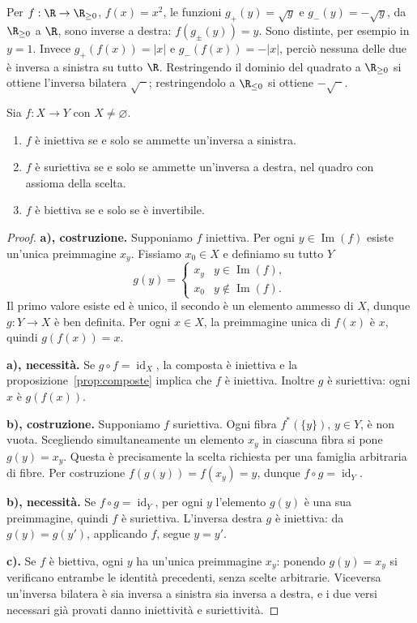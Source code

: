 \begin{esempio}
Per $f:\R\to\R_{\ge0}$, $f(x)=x^2$, le funzioni $g_+(y)=\sqrt y$ e $g_-(y)=-\sqrt y$, da $\R_{\ge0}$ a $\R$, sono inverse a destra: $f(g_\pm(y))=y$. Sono distinte, per esempio in $y=1$. Invece $g_+(f(x))=|x|$ e $g_-(f(x))=-|x|$, perciò nessuna delle due è inversa a sinistra su tutto $\R$. Restringendo il dominio del quadrato a $\R_{\ge0}$ si ottiene l'inversa bilatera $\sqrt{\phantom{x}}$; restringendolo a $\R_{\le0}$ si ottiene $-\sqrt{\phantom{x}}$.
\end{esempio}

\begin{teorema}\label{teo:inverse}
Sia $f:X\to Y$ con $X\ne\varnothing$.
\begin{enumerate}[label=\alph*)]
\item $f$ è iniettiva se e solo se ammette un'inversa a sinistra.
\item $f$ è suriettiva se e solo se ammette un'inversa a destra, nel quadro con assioma della scelta.
\item $f$ è biettiva se e solo se è invertibile.
\end{enumerate}
\end{teorema}
\begin{proof}
\textbf{a), costruzione.} Supponiamo $f$ iniettiva. Per ogni $y\in\operatorname{Im}(f)$ esiste un'unica preimmagine $x_y$. Fissiamo $x_0\in X$ e definiamo su tutto $Y$
\[
g(y)=\begin{cases}x_y&y\in\operatorname{Im}(f),\\x_0&y\notin\operatorname{Im}(f).\end{cases}
\]
Il primo valore esiste ed è unico, il secondo è un elemento ammesso di $X$, dunque $g:Y\to X$ è ben definita. Per ogni $x\in X$, la preimmagine unica di $f(x)$ è $x$, quindi $g(f(x))=x$.

\textbf{a), necessità.} Se $g\circ f=\operatorname{id}_X$, la composta è iniettiva e la proposizione~\ref{prop:composte} implica che $f$ è iniettiva. Inoltre $g$ è suriettiva: ogni $x$ è $g(f(x))$.

\textbf{b), costruzione.} Supponiamo $f$ suriettiva. Ogni fibra $f^*(\{y\})$, $y\in Y$, è non vuota. Scegliendo simultaneamente un elemento $x_y$ in ciascuna fibra si pone $g(y)=x_y$. Questa è precisamente la scelta richiesta per una famiglia arbitraria di fibre. Per costruzione $f(g(y))=f(x_y)=y$, dunque $f\circ g=\operatorname{id}_Y$.

\textbf{b), necessità.} Se $f\circ g=\operatorname{id}_Y$, per ogni $y$ l'elemento $g(y)$ è una sua preimmagine, quindi $f$ è suriettiva. L'inversa destra $g$ è iniettiva: da $g(y)=g(y')$, applicando $f$, segue $y=y'$.

\textbf{c).} Se $f$ è biettiva, ogni $y$ ha un'unica preimmagine $x_y$: ponendo $g(y)=x_y$ si verificano entrambe le identità precedenti, senza scelte arbitrarie. Viceversa un'inversa bilatera è sia inversa a sinistra sia inversa a destra, e i due versi necessari già provati danno iniettività e suriettività.
\end{proof}

